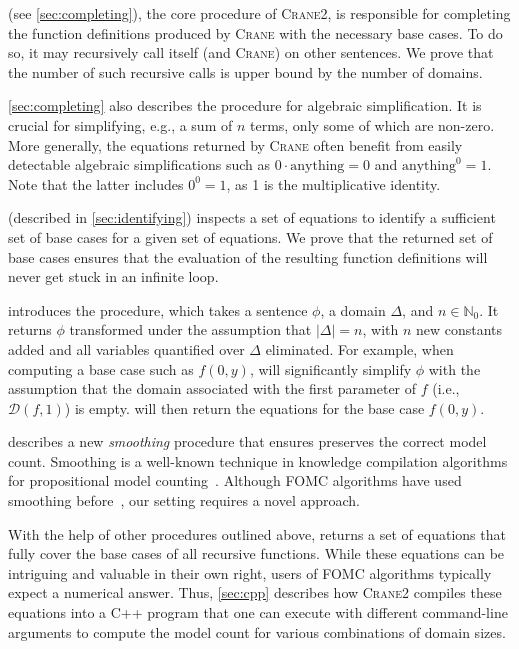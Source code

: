 \documentclass[a4paper,UKenglish,cleveref,autoref,table]{lipics-v2021}
\newcommand{\Cranetwo}{\textsc{Crane2}}
\begin{document}
\CompileWithBaseCases (see \cref{sec:completing}), the core procedure of
\Cranetwo{}, is responsible for completing the function definitions produced by
\textsc{Crane} with the necessary base cases. To do so, it may recursively call
itself (and \textsc{Crane}) on other sentences. We prove that the number of such
recursive calls is upper bound by the number of domains.

\cref{sec:completing} also describes the \Simplify procedure for algebraic
simplification. It is crucial for simplifying, e.g., a sum of $n$ terms, only
some of which are non-zero. More generally, the equations returned by
\textsc{Crane} often benefit from easily detectable algebraic simplifications
such as $0 \cdot \text{anything} = 0$ and $\text{anything}^{0} = 1$. Note that
the latter includes $0^{0} = 1$, as 1 is the multiplicative identity.

\FindBaseCases (described in \cref{sec:identifying}) inspects a set of equations
to identify a sufficient set of base cases for a given set of equations. We
prove that the returned set of base cases ensures that the evaluation of the
resulting function definitions will never get stuck in an infinite loop.

 introduces the \Propagate procedure, which takes a
sentence $\phi$, a domain $\Delta$, and $n \in \mathbb{N}_{0}$. It returns
$\phi$ transformed under the assumption that $|\Delta| = n$, with $n$ new
constants added and all variables quantified over $\Delta$ eliminated. For
example, when computing a base case such as $f(0, y)$, \Propagate will
significantly simplify $\phi$ with the assumption that the domain associated
with the first parameter of $f$ (i.e., $\mathcal{D}(f, 1)$) is empty.
 will then
return the equations for the base case $f(0, y)$.

 describes a new \emph{smoothing} procedure that ensures
\Propagate preserves the correct model count. Smoothing is a well-known
technique in knowledge compilation algorithms for propositional model
counting~\cite{darwiche2001tractable}. Although FOMC algorithms have used
smoothing before~\cite{DBLP:conf/ijcai/BroeckTMDR11}, our setting requires a
novel approach.

With the help of other procedures outlined above, \CompileWithBaseCases returns
a set of equations that fully cover the base cases of all recursive functions.
While these equations can be intriguing and valuable in their own right, users
of FOMC algorithms typically expect a numerical answer. Thus, \cref{sec:cpp}
describes how \Cranetwo{} compiles these equations into a C++ program that one
can execute with different command-line arguments to compute the model count for
various combinations of domain sizes.
\end{document}
